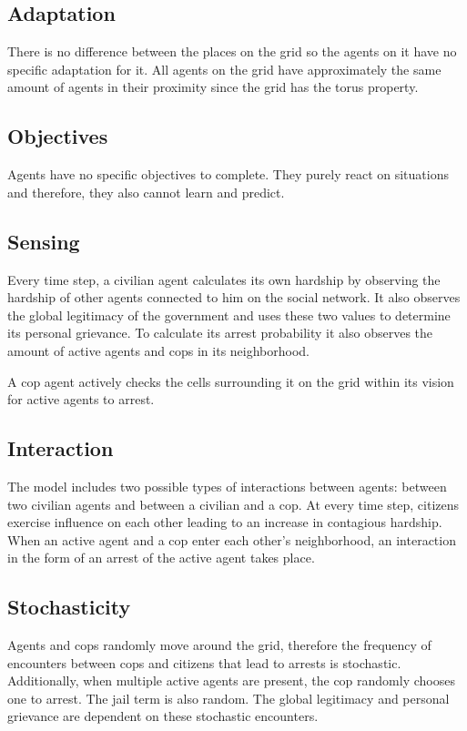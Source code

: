 \documentclass[10pt]{article}
\begin{document}
    \subsection{Adaptation}
    There is no difference between the places on the grid so the agents on it have no specific adaptation for it. All agents on the grid have approximately the same amount of agents in their proximity since the grid has the torus property.

    \subsection{Objectives}
    Agents have no specific objectives to complete. They purely react on situations and therefore, they also cannot learn and predict.

    \subsection{Sensing}
    Every time step, a civilian agent calculates its own hardship by observing the hardship of other agents connected to him on the social network. It also observes the global legitimacy of the government and uses these two values to determine its personal grievance. To calculate its arrest probability it also observes the amount of active agents and cops in its neighborhood.

    A cop agent actively checks the cells surrounding it on the grid within its vision for active agents to arrest.

    \subsection{Interaction}
    The model includes two possible types of interactions between agents: between two civilian agents and between a civilian and a cop. At every time step, citizens exercise influence on each other leading to an increase in contagious hardship. When an active agent and a cop enter each other's neighborhood, an interaction in the form of an arrest of the active agent takes place.

    \subsection{Stochasticity}
    Agents and cops randomly move around the grid, therefore the frequency of encounters between cops and citizens that lead to arrests is stochastic. Additionally, when multiple active agents are present, the cop randomly chooses one to arrest. The jail term is also random. The global legitimacy and personal grievance are dependent on these stochastic encounters.
\end{document}
